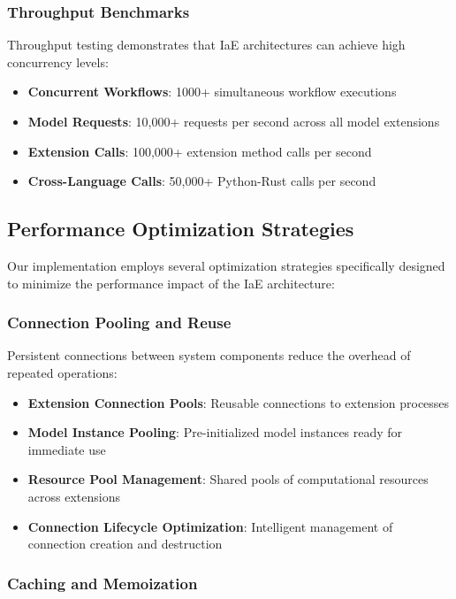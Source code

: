 \subsubsection{Throughput Benchmarks}

Throughput testing demonstrates that IaE architectures can achieve high concurrency levels:

\begin{itemize}
    \item \textbf{Concurrent Workflows}: 1000+ simultaneous workflow executions
    \item \textbf{Model Requests}: 10,000+ requests per second across all model extensions
    \item \textbf{Extension Calls}: 100,000+ extension method calls per second
    \item \textbf{Cross-Language Calls}: 50,000+ Python-Rust calls per second
\end{itemize}

\subsection{Performance Optimization Strategies}

Our implementation employs several optimization strategies specifically designed to minimize the performance impact of the IaE architecture:

\subsubsection{Connection Pooling and Reuse}

Persistent connections between system components reduce the overhead of repeated operations:

\begin{itemize}
    \item \textbf{Extension Connection Pools}: Reusable connections to extension processes
    \item \textbf{Model Instance Pooling}: Pre-initialized model instances ready for immediate use
    \item \textbf{Resource Pool Management}: Shared pools of computational resources across extensions
    \item \textbf{Connection Lifecycle Optimization}: Intelligent management of connection creation and destruction
\end{itemize}

\subsubsection{Caching and Memoization}

